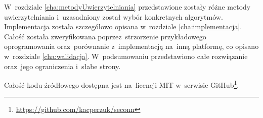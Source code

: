 W~rozdziale \ref{cha:metodyUwierzytelniania} przedstawione zostały różne metody uwierzytelniania i~uzasadniony został wybór konkretnych algorytmów. Implementacja została szczegółowo opisana w~rozdziale \ref{cha:implementacja}. Całość została zweryfikowana poprzez~strzorzenie przykładowego oprogramowania oraz~porównanie z~implementacją na~inną platformę, co opisano w~rozdziale \ref{cha:walidacja}. W~podsumowaniu przedstawiono całe rozwiązanie oraz~jego ograniczenia i~słabe strony.

Całość kodu źródłowego dostępna jest na~licencji MIT w~serwisie GitHub\footnote{\url{https://github.com/kacperzuk/seconn}}.
